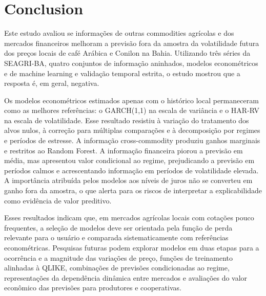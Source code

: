 \documentclass[a4paper,fleqn]{cas-sc}
\begin{document}
\section{Conclusion}
\label{sec:conclusion}

Este estudo avaliou se informações de outras commodities agrícolas e dos mercados financeiros melhoram a previsão fora da amostra da volatilidade futura dos preços locais de café Arábica e Conilon na Bahia. Utilizando três séries da SEAGRI-BA, quatro conjuntos de informação aninhados, modelos econométricos e de machine learning e validação temporal estrita, o estudo mostrou que a resposta é, em geral, negativa.

Os modelos econométricos estimados apenas com o histórico local permaneceram como as melhores referências: o GARCH(1,1) na escala de variância e o HAR-RV na escala de volatilidade. Esse resultado resistiu à variação do tratamento dos alvos nulos, à correção para múltiplas comparações e à decomposição por regimes e períodos de estresse. A informação cross-commodity produziu ganhos marginais e restritos ao Random Forest. A informação financeira piorou a previsão em média, mas apresentou valor condicional ao regime, prejudicando a previsão em períodos calmos e acrescentando informação em períodos de volatilidade elevada. A importância atribuída pelos modelos aos níveis de juros não se converteu em ganho fora da amostra, o que alerta para os riscos de interpretar a explicabilidade como evidência de valor preditivo.

Esses resultados indicam que, em mercados agrícolas locais com cotações pouco frequentes, a seleção de modelos deve ser orientada pela função de perda relevante para o usuário e comparada sistematicamente com referências econométricas. Pesquisas futuras podem explorar modelos em duas etapas para a ocorrência e a magnitude das variações de preço, funções de treinamento alinhadas à QLIKE, combinações de previsões condicionadas ao regime, representações da dependência dinâmica entre mercados e avaliações do valor econômico das previsões para produtores e cooperativas.



\end{document}
